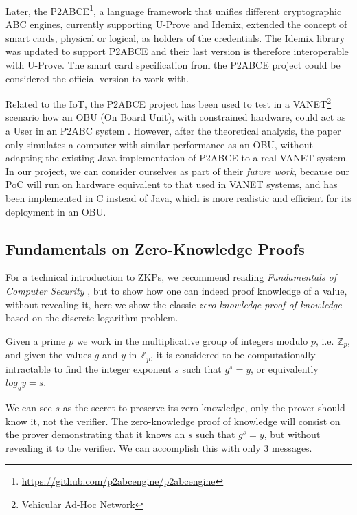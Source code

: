 Later, the P2ABCE\footnote{\url{https://github.com/p2abcengine/p2abcengine}}, a language framework that unifies different cryptographic ABC engines, currently supporting U-Prove and Idemix, extended the concept of smart cards, physical or logical, as holders of the credentials. The Idemix library was updated to support P2ABCE and their last version is therefore interoperable with U-Prove. The smart card specification from the P2ABCE project could be considered the official version to work with.


Related to the IoT, the P2ABCE project has been used to test in a VANET\footnote{Vehicular Ad-Hoc Network} scenario how an OBU (On Board Unit), with constrained hardware, could act as a User in an P2ABC system \cite{vanet}. However, after the theoretical analysis, the paper only simulates a computer with similar performance as an OBU, without adapting the existing Java implementation of P2ABCE to a real VANET system. In our project, we can consider ourselves as part of their \textit{future work}, because our PoC will run on hardware equivalent to that used in VANET systems, and has been implemented in C instead of Java, which is more realistic and efficient for its deployment in an OBU.

\subsection{Fundamentals on Zero-Knowledge Proofs}

For a technical introduction to ZKPs, we recommend reading \textit{Fundamentals of Computer Security} \cite[Chapter 12]{book:856771}, but to show how one can indeed proof knowledge of a value, without revealing it, here we show the classic \textit{zero-knowledge proof of knowledge} based on the discrete logarithm problem.

Given a prime $p$ we work in the multiplicative group of integers modulo $p$, i.e. $\mathbb{Z}_p$, and given the values $g$ and $y$ in $\mathbb{Z}_p$, it is considered to be computationally intractable to find the integer exponent $s$ such that $g^s = y$, or equivalently $log_g y = s$.

We can see $s$ as the secret to preserve its zero-knowledge, only the prover should know it, not the verifier. The zero-knowledge proof of knowledge will consist on the prover demonstrating that it knows an $s$ such that $g^s = y$, but without revealing it to the verifier. We can accomplish this with only 3 messages.

